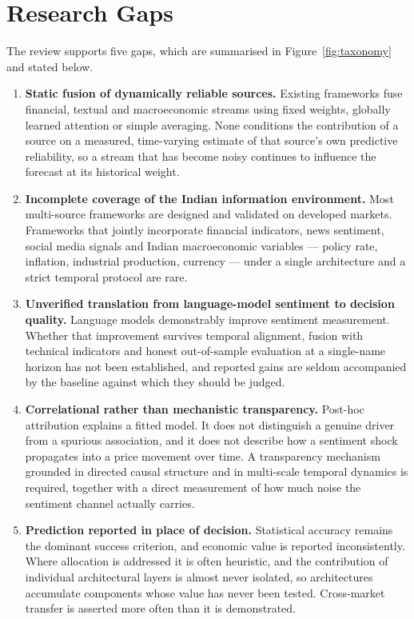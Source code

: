 \section{Research Gaps}

The review supports five gaps, which are summarised in Figure~\ref{fig:taxonomy} and
stated below.

\begin{enumerate}[label=\textbf{G\arabic*.}]
\item \textbf{Static fusion of dynamically reliable sources.} Existing frameworks fuse
financial, textual and macroeconomic streams using fixed weights, globally learned
attention or simple averaging. None conditions the contribution of a source on a
measured, time-varying estimate of that source's own predictive reliability, so a stream
that has become noisy continues to influence the forecast at its historical weight.

\item \textbf{Incomplete coverage of the Indian information environment.} Most
multi-source frameworks are designed and validated on developed markets. Frameworks that
jointly incorporate financial indicators, news sentiment, social media signals and Indian
macroeconomic variables --- policy rate, inflation, industrial production, currency ---
under a single architecture and a strict temporal protocol are rare.

\item \textbf{Unverified translation from language-model sentiment to decision quality.}
Language models demonstrably improve sentiment measurement. Whether that improvement
survives temporal alignment, fusion with technical indicators and honest out-of-sample
evaluation at a single-name horizon has not been established, and reported gains are
seldom accompanied by the baseline against which they should be judged.

\item \textbf{Correlational rather than mechanistic transparency.} Post-hoc attribution
explains a fitted model. It does not distinguish a genuine driver from a spurious
association, and it does not describe how a sentiment shock propagates into a price
movement over time. A transparency mechanism grounded in directed causal structure and in
multi-scale temporal dynamics is required, together with a direct measurement of how much
noise the sentiment channel actually carries.

\item \textbf{Prediction reported in place of decision.} Statistical accuracy remains the
dominant success criterion, and economic value is reported inconsistently. Where
allocation is addressed it is often heuristic, and the contribution of individual
architectural layers is almost never isolated, so architectures accumulate components
whose value has never been tested. Cross-market transfer is asserted more often than it
is demonstrated.
\end{enumerate}

